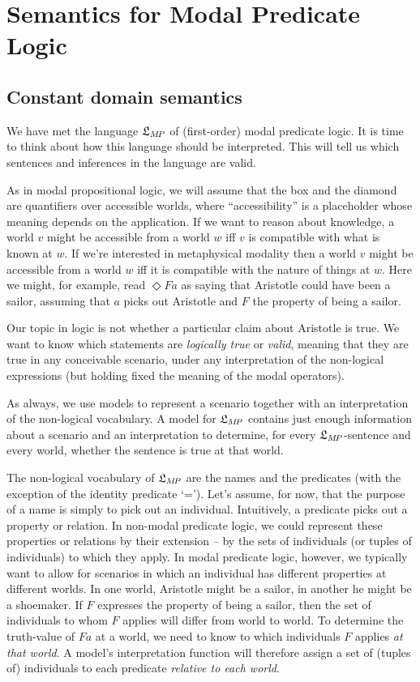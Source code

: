\chapter{Semantics for Modal Predicate Logic}\label{ch:qml2}

\section{Constant domain semantics}\label{sec:constantdomainsemantics}

We have met the language $\mathfrak{L}_{M\!P}$ of (first-order) modal predicate logic. It
is time to think about how this language should be interpreted. This will tell
us which sentences and inferences in the language are valid.

As in modal propositional logic, we will assume that the box and the diamond are
quantifiers over accessible worlds, where ``accessibility'' is a placeholder
whose meaning depends on the application. If we want to reason about knowledge,
a world $v$ might be accessible from a world $w$ iff $v$ is compatible with what
is known at $w$. If we're interested in metaphysical modality then a world $v$
might be accessible from a world $w$ iff it is compatible with the nature of
things at $w$. Here we might, for example, read $\Diamond Fa$ as saying that
Aristotle could have been a sailor, assuming that $a$ picks out Aristotle and
$F$ the property of being a sailor.

Our topic in logic is not whether a particular claim about Aristotle is true. We
want to know which statements are \emph{logically true} or \emph{valid}, meaning
that they are true in any conceivable scenario, under any interpretation of the
non-logical expressions (but holding fixed the meaning of the modal operators).

As always, we use models to represent a scenario together with an interpretation
of the non-logical vocabulary. A model for $\mathfrak{L}_{M\!P}$ contains just enough
information about a scenario and an interpretation to determine, for every
$\mathfrak{L}_{M\!P}$-sentence and every world, whether the sentence is true at that
world.

The non-logical vocabulary of $\mathfrak{L}_{M\!P}$ are the names and the predicates (with
the exception of the identity predicate `='). Let's assume, for now, that the
purpose of a name is simply to pick out an individual. Intuitively, a predicate
picks out a property or relation. In non-modal predicate logic, we could
represent these properties or relations by their extension -- by the sets of
individuals (or tuples of individuals) to which they apply. In modal predicate
logic, however, we typically want to allow for scenarios in which an individual
has different properties at different worlds. In one world, Aristotle might be a
sailor, in another he might be a shoemaker. If $F$ expresses the property of
being a sailor, then the set of individuals to whom $F$ applies will differ from
world to world. To determine the truth-value of $Fa$ at a world, we need to know
to which individuals $F$ applies \emph{at that world}. A model's interpretation
function will therefore assign a set of (tuples of) individuals to each
predicate \emph{relative to each world}.

